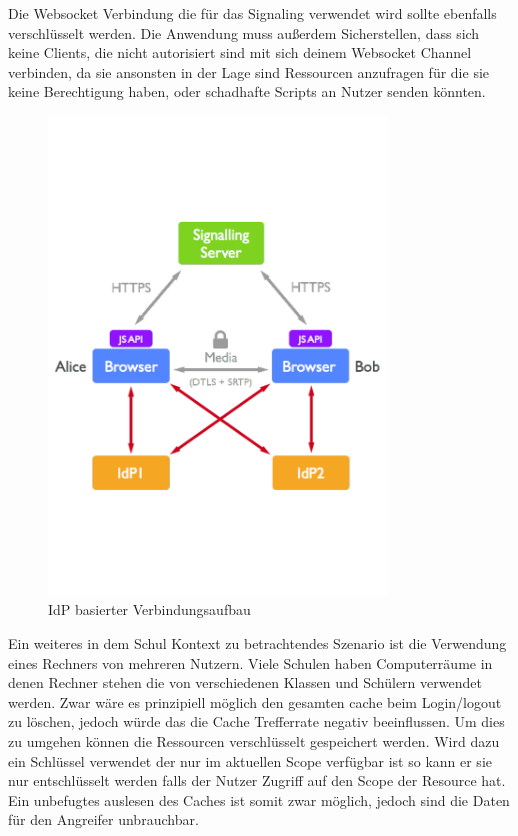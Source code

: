 Die Websocket Verbindung die für das Signaling verwendet wird sollte ebenfalls verschlüsselt werden. Die Anwendung muss außerdem Sicherstellen, dass sich keine Clients, die nicht autorisiert sind mit sich deinem Websocket Channel verbinden, da sie ansonsten in der Lage sind Ressourcen anzufragen für die sie keine Berechtigung haben, oder schadhafte Scripts an Nutzer senden könnten.

\begin{figure}[!h]
	\centering
	\includegraphics[width=0.8\textwidth]{figures/user_auth}
	\caption[A Figure Short-Title]{IdP basierter Verbindungsaufbau\cite{rtcweb-security}}
	\label{fig:user_auth}
\end{figure}

Ein weiteres in dem Schul Kontext zu betrachtendes Szenario ist die Verwendung eines Rechners von mehreren Nutzern. Viele Schulen haben Computerräume in denen Rechner stehen die von verschiedenen Klassen und Schülern verwendet werden. Zwar wäre es prinzipiell möglich den gesamten cache beim Login/logout zu löschen, jedoch würde das die Cache Trefferrate negativ beeinflussen. Um dies zu umgehen können die Ressourcen verschlüsselt gespeichert werden. Wird dazu ein Schlüssel verwendet der nur im aktuellen Scope verfügbar ist so kann er sie nur entschlüsselt werden falls der Nutzer Zugriff auf den Scope der Resource hat. Ein unbefugtes auslesen des Caches ist somit zwar möglich, jedoch sind die Daten für den Angreifer unbrauchbar.

